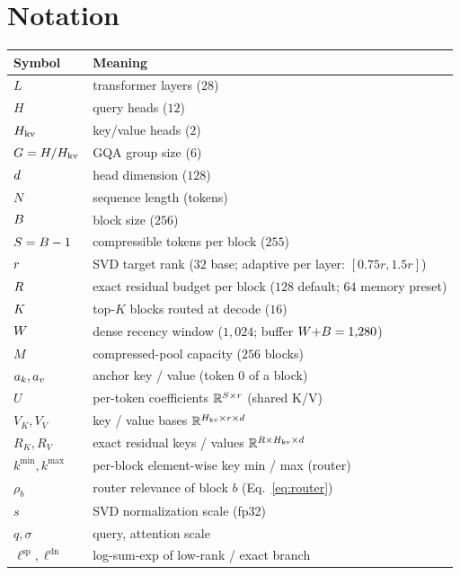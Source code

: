 \section{Notation}
\label{app:notation}

\begin{center}
\begin{tabular}{ll}
\toprule
Symbol & Meaning \\
\midrule
$L$ & transformer layers ($28$) \\
$H$ & query heads ($12$) \\
$H_{\mathrm{kv}}$ & key/value heads ($2$) \\
$G=H/H_{\mathrm{kv}}$ & GQA group size ($6$) \\
$d$ & head dimension ($128$) \\
$N$ & sequence length (tokens) \\
$B$ & block size ($256$) \\
$S=B-1$ & compressible tokens per block ($255$) \\
$r$ & SVD target rank ($32$ base; adaptive per layer: $[0.75r, 1.5r]$) \\
$R$ & exact residual budget per block ($128$ default; $64$ memory preset) \\
$K$ & top-$K$ blocks routed at decode ($16$) \\
$W$ & dense recency window ($1{,}024$; buffer $W{+}B=1{,}280$) \\
$M$ & compressed-pool capacity ($256$ blocks) \\
$a_k,a_v$ & anchor key / value (token $0$ of a block) \\
$U$ & per-token coefficients $\mathbb{R}^{S\times r}$ (shared K/V) \\
$V_K,V_V$ & key / value bases $\mathbb{R}^{H_{\mathrm{kv}}\times r\times d}$ \\
$R_K,R_V$ & exact residual keys / values $\mathbb{R}^{R\times H_{\mathrm{kv}}\times d}$ \\
$k^{\min},k^{\max}$ & per-block element-wise key min / max (router) \\
$\rho_b$ & router relevance of block $b$ (Eq.~\ref{eq:router}) \\
$s$ & SVD normalization scale (fp32) \\
$q,\sigma$ & query, attention scale \\
$\ell^{\text{sp}},\ell^{\text{dn}}$ & log-sum-exp of low-rank / exact branch \\
\bottomrule
\end{tabular}
\end{center}
